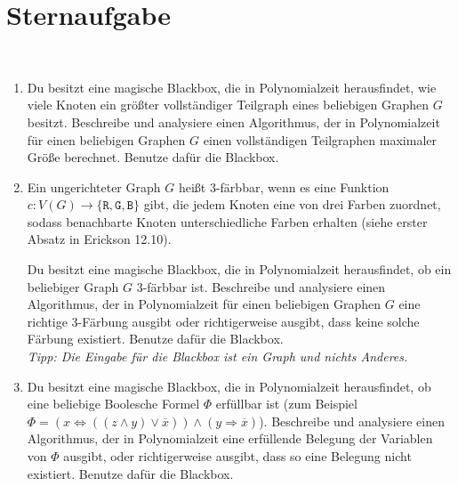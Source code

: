 \documentclass{uebung_cs}
\begin{document}


\section*{Sternaufgabe}

\begin{aufgabe}\
	\begin{enumerate}
		\item Du besitzt eine magische Blackbox, die in Polynomialzeit herausfindet, wie viele Knoten ein größter vollständiger Teilgraph eines beliebigen Graphen $G$ besitzt. Beschreibe und analysiere einen Algorithmus, der in Polynomialzeit für einen beliebigen Graphen $G$ einen vollständigen Teilgraphen maximaler Größe berechnet. Benutze dafür die Blackbox.
		
		\item Ein ungerichteter Graph $G$ heißt $3$-färbbar, wenn es eine Funktion $c:V(G)\to\{\texttt{R},\texttt{G},\texttt{B}\}$ gibt, die jedem Knoten eine von drei Farben zuordnet, sodass benachbarte Knoten unterschiedliche Farben erhalten (siehe erster Absatz in Erickson 12.10).
	
		Du besitzt eine magische Blackbox, die in Polynomialzeit herausfindet, ob ein beliebiger Graph $G$ $3$-färbbar ist. Beschreibe und analysiere einen Algorithmus, der in Polynomialzeit für einen beliebigen Graphen $G$ eine richtige $3$-Färbung ausgibt oder richtigerweise ausgibt, dass keine solche Färbung existiert. Benutze dafür die Blackbox.\\
		\textit{Tipp: Die Eingabe für die Blackbox ist ein Graph und nichts Anderes.}
		
		\item Du besitzt eine magische Blackbox, die in Polynomialzeit herausfindet, ob eine beliebige Boolesche Formel $\Phi$ erfüllbar ist (zum Beispiel $\Phi= (x \Leftrightarrow ((z\wedge y)\vee \overline{x})) \wedge (y \Rightarrow \overline{x})$). Beschreibe und analysiere einen Algorithmus, der in Polynomialzeit eine erfüllende Belegung der Variablen von $\Phi$ ausgibt, oder richtigerweise ausgibt, dass so eine Belegung nicht existiert. Benutze dafür die Blackbox.
	\end{enumerate}
\end{aufgabe}
\end{document}
